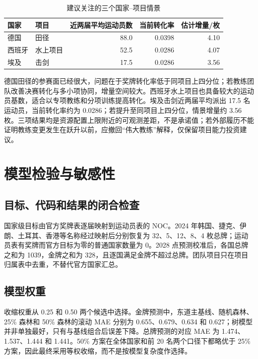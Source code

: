 \documentclass[UTF8,11pt,a4paper]{ctexart}
\begin{document}
\begin{table}[H]
\centering
\caption{建议关注的三个国家--项目情景}
\label{tab:coach}
\begin{tabular}{llrrr}
\toprule
国家 & 项目 & 近两届平均运动员数 & 当前转化率 & 估计增量/枚\\
\midrule
德国 & 田径 & 88.0 & 0.0398 & 4.10\\
西班牙 & 水上项目 & 52.5 & 0.0286 & 4.07\\
埃及 & 击剑 & 17.5 & 0.0286 & 3.56\\
\bottomrule
\end{tabular}
\end{table}

德国田径的参赛面已经很大，问题在于奖牌转化率低于同项目上四分位；若教练团队改善决赛转化与多小项协同，增量空间较大。西班牙水上项目也具备较大的运动员基数，适合以专项教练和分项训练提高转化。埃及击剑近两届平均派出 17.5 名运动员，当前转化率约为 0.0286；若提升至同项目上四分位，情景增量约 3.56 枚。三项结果均是资源配置上限附近的可观测差距，不是承诺值；若外部履历不能证明教练变更发生在跃升以前，应撤回“伟大教练”解释，仅保留项目能力投资建议。

\section{模型检验与敏感性}

\subsection{目标、代码和结果的闭合检查}

国家级目标由官方奖牌表逐届映射到运动员表的 NOC。2024 年韩国、捷克、伊朗、土耳其、香港等名称经过映射后分别恢复为 32、5、12、8、4 枚总牌；运动员表有奖牌而官方目标为零的普通国家数量为 0。2028 点预测校准后，各国总牌之和为 1039，金牌之和为 328，且逐国满足金牌不超过总牌。团队项目只在项目归属表中去重，不替代官方国家汇总。

\subsection{模型权重}

收缩权重从 0.25 和 0.50 两个候选中选择。金牌预测中，东道主基线、随机森林、25\% 森林和 50\% 森林的滚动 MAE 分别为 0.655、0.679、0.634 和 0.627；树模型并非单独最好，只有与基线组合后误差下降。总牌预测的对应 MAE 为 1.474、1.537、1.444 和 1.441。50\% 方案在全体国家和前 20 名两个口径下都略优于 25\% 方案，因此最终采用等权收缩，而不是按模型复杂度作选择。
\end{document}
